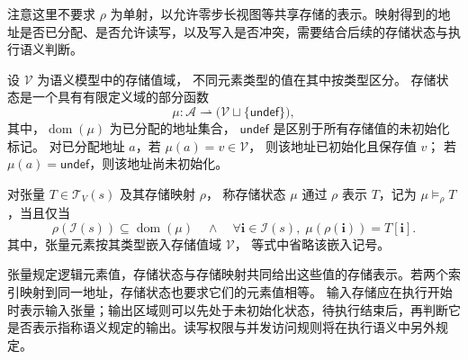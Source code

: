 注意这里不要求 \(\rho\) 为单射，以允许零步长视图等共享存储的表示。映射得到的地址是否已分配、是否允许读写，以及写入是否冲突，需要结合后续的存储状态与执行语义判断。

\begin{definition}[存储状态]
    设 \(\mathcal V\) 为语义模型中的存储值域，
    不同元素类型的值在其中按类型区分。
    存储状态是一个具有有限定义域的部分函数
    \[
      \mu:\mathcal A\rightharpoonup
      \bigl(\mathcal V\sqcup\{\mathsf{undef}\}\bigr),
    \]
    其中，\(\operatorname{dom}(\mu)\) 为已分配的地址集合，
    \(\mathsf{undef}\) 是区别于所有存储值的未初始化标记。
    对已分配地址 \(a\)，若 \(\mu(a)=v\in\mathcal V\)，
    则该地址已初始化且保存值 \(v\)；
    若 \(\mu(a)=\mathsf{undef}\)，则该地址尚未初始化。
\end{definition}

对张量 \(T\in\mathcal T_V(s)\) 及其存储映射 \(\rho\)，
称存储状态 \(\mu\) 通过 \(\rho\) 表示 \(T\)，记为
\(\mu\models_\rho T\)，当且仅当
\[
  \rho(\mathcal I(s))\subseteq\operatorname{dom}(\mu)
  \quad\land\quad
  \forall\boldsymbol i\in\mathcal I(s),\;
  \mu(\rho(\boldsymbol i))=T[\boldsymbol i].
\]
其中，张量元素按其类型嵌入存储值域 \(\mathcal V\)，
等式中省略该嵌入记号。

张量规定逻辑元素值，存储状态与存储映射共同给出这些值的存储表示。若两个索引映射到同一地址，存储状态也要求它们的元素值相等。
输入存储应在执行开始时表示输入张量；输出区域则可以先处于未初始化状态，待执行结束后，再判断它是否表示指称语义规定的输出。读写权限与并发访问规则将在执行语义中另外规定。